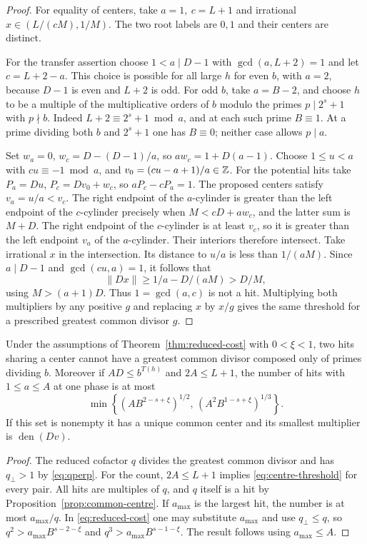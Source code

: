 \begin{proof}
For equality of centers, take \(a=1,\ c=L+1\) and irrational
\(x\in(L/(cM),1/M)\). The two root labels are \(0,1\) and their
centers are distinct.

For the transfer assertion choose \(1<a\mid D-1\) with
\(\gcd(a,L+2)=1\) and let \(c=L+2-a\).
This choice is possible for all large \(h\) for even \(b\),
with \(a=2\), because \(D-1\) is even and \(L+2\) is odd.
For odd \(b\), take \(a=B-2\), and choose \(h\) to be a
multiple of the multiplicative orders of \(b\) modulo the
primes \(p\mid 2^s+1\) with \(p\nmid b\). Indeed
\(L+2\equiv 2^s+1\bmod a\), and at each such prime \(B\equiv1\).
At a prime dividing both \(b\) and \(2^s+1\) one has \(B\equiv0\);
neither case allows \(p\mid a\).

Set \(w_a=0\), \(w_c=D-(D-1)/a\), so \(a w_c=1+D(a-1)\).
Choose \(1\le u<a\) with \(cu\equiv-1\bmod a\),
and \(v_0=(cu-a+1)/a\in\mathbb Z\). For the potential hits take
\(P_a=Du\), \(P_c=Dv_0+w_c\), so \(aP_c-cP_a=1\).
The proposed centers satisfy \(v_a=u/a<v_c\).
The right endpoint of the \(a\)-cylinder is greater than the
left endpoint of the \(c\)-cylinder precisely when
\(M<cD+a w_c\), and the latter sum is \(M+D\).
The right endpoint of the \(c\)-cylinder is at least \(v_c\),
so it is greater than the left endpoint \(v_a\) of the
\(a\)-cylinder. Their interiors therefore intersect.
Take irrational \(x\) in the intersection. Its distance to
\(u/a\) is less than \(1/(aM)\). Since \(a\mid D-1\) and
\(\gcd(cu,a)=1\), it follows that
\[
  \|Dx\|\ge 1/a-D/(aM)>D/M,
\]
using \(M>(a+1)D\). Thus \(1=\gcd(a,c)\) is not a hit.
Multiplying both multipliers by any positive \(g\) and replacing
\(x\) by \(x/g\) gives the same threshold for a prescribed
greatest common divisor \(g\).
\end{proof}

\begin{corollary}\label{cor:centre-obstructions}
Under the assumptions of Theorem~\ref{thm:reduced-cost} with
\(0<\xi<1\), two hits sharing a center cannot have a greatest
common divisor composed only of primes dividing \(b\).
Moreover if \(A D\le b^{T(h)}\) and \(2A\le L+1\), the number
of hits with \(1\le a\le A\) at one phase is at most
\[
 \min\!\left\{
      (A B^{2-s+\xi})^{1/2},\,
      (A^2 B^{1-s+\xi})^{1/3}
      \right\}.
\]
If this set is nonempty it has a unique common center and its
smallest multiplier is \(\operatorname{den}(Dv)\).
\end{corollary}

\begin{proof}
The reduced cofactor \(q\) divides the greatest common divisor
and has \(q_\perp>1\) by \eqref{eq:qperp}.
For the count, \(2A\le L+1\) implies \eqref{eq:centre-threshold}
for every pair.
All hits are multiples of \(q\), and \(q\) itself is a hit by
Proposition~\ref{prop:common-centre}. If \(a_{\max}\) is the
largest hit, the number is at most \(a_{\max}/q\).
In \eqref{eq:reduced-cost} one may substitute \(a_{\max}\)
and use \(q_\perp\le q\), so
\(q^2>a_{\max}B^{s-2-\xi}\) and
\(q^3>a_{\max}B^{s-1-\xi}\). The result follows using
\(a_{\max}\le A\).
\end{proof}

